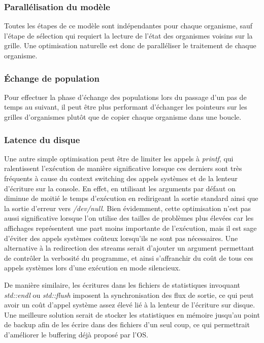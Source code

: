 \documentclass[a4paper, 10pt, twoside]{article}
\begin{document}
\subsubsection*{Parallélisation du modèle}

Toutes les étapes de ce modèle sont indépendantes pour chaque organisme, sauf l'étape de sélection qui requiert la lecture de l'état des organismes voisins sur la grille. Une optimisation naturelle est donc de paralléliser le traitement de chaque organisme\label{parallel/orga}.

\subsubsection*{Échange de population}

Pour effectuer la phase d'échange des populations lors du passage d'un pas de temps au suivant, il peut être plus performant d'échanger les pointeurs sur les grilles d'organismes plutôt que de copier chaque organisme dans une boucle.

\subsubsection*{Latence du disque}

Une autre simple optimisation peut être de limiter les appels à \textit{printf}, qui ralentissent l'exécution de manière significative lorsque ces derniers sont très fréquents à cause du context switching des appels systèmes et de la lenteur d'écriture sur la console. En effet, en utilisant les arguments par défaut on diminue de moitié le temps d'exécution en redirigeant la sortie standard ainsi que la sortie d'erreur vers \textit{/dev/null}. Bien évidemment, cette optimisation n'est pas aussi significative lorsque l'on utilise des tailles de problèmes plus élevées car les affichages représentent une part moins importante de l'exécution, mais il est sage d'éviter des appels systèmes coûteux lorsqu'ils ne sont pas nécessaires. Une alternative à la redirection des streams serait d'ajouter un argument permettant de contrôler la verbosité du programme, et ainsi s'affranchir du coût de tous ces appels systèmes lors d'une exécution en mode silencieux.

De manière similaire, les écritures dans les fichiers de statistiques invoquant \textit{std::endl} ou \textit{std::flush} imposent la synchronisation des flux de sortie, ce qui peut avoir un coût d'appel système assez élevé lié à la lenteur de l'écriture sur disque. Une meilleure solution serait de stocker les statistiques en mémoire jusqu'au point de backup afin de les écrire dans des fichiers d'un seul coup, ce qui permettrait d'améliorer le buffering déjà proposé par l'OS.
\end{document}
